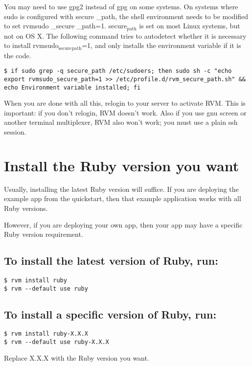 \documentclass[11pt]{article}
\begin{document}
You may need to use gpg2 instead of gpg on some systems.
On systems where sudo is configured with secure \_path, the shell environment needs to be modified to set rvmsudo \_secure \_path=1. secure\(_{\text{path}}\) is set on most Linux systems, but not on OS X. The following command tries to autodetect whether it is necessary to install rvmsudo\(_{\text{secure}}\)\(_{\text{path}}\)=1, and only installs the environment variable if it is the code.
\begin{verbatim}
$ if sudo grep -q secure_path /etc/sudoers; then sudo sh -c "echo export rvmsudo_secure_path=1 >> /etc/profile.d/rvm_secure_path.sh" && echo Environment variable installed; fi
\end{verbatim}

When you are done with all this, relogin to your server to activate RVM. This is important: if you don't relogin, RVM doesn't work. Also if you use gnu screen or another terminal multiplexer, RVM also won't work; you must use a plain ssh session.

\section{Install the Ruby version you want}
\label{sec:org6f843de}

Usually, installing the latest Ruby version will suffice. If you are deploying the example app from the quickstart, then that example application works with all Ruby versions.

However, if you are deploying your own app, then your app may have a specific Ruby version requirement.

\subsection{To install the latest version of Ruby, run:}
\label{sec:org38d0f07}

\begin{verbatim}
$ rvm install ruby
$ rvm --default use ruby
\end{verbatim}
\subsection{To install a specific version of Ruby, run:}
\label{sec:orge92f48b}
\begin{verbatim}
$ rvm install ruby-X.X.X
$ rvm --default use ruby-X.X.X
\end{verbatim}

Replace X.X.X with the Ruby version you want.
\end{document}

